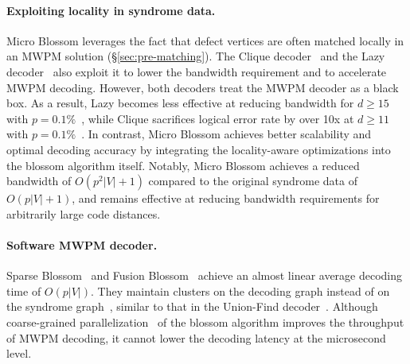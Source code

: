 \paragraph{Exploiting locality in syndrome data.} Micro Blossom leverages the fact that defect vertices are often matched locally in an MWPM solution (\S\ref{sec:pre-matching}).
The Clique decoder~\cite{ravi2023better} and the Lazy decoder~\cite{delfosse2020hierarchical} also exploit it to lower the bandwidth requirement and to accelerate MWPM decoding.
However, both decoders treat the MWPM decoder as a black box. As a result, Lazy becomes less effective at reducing bandwidth for $d \ge 15$ with $p=0.1\%$~\cite{delfosse2020hierarchical}, 
while Clique sacrifices logical error rate by over 10x at $d \ge 11$ with $p=0.1\%$~\cite{ravi2023better}.
In contrast, Micro Blossom achieves better scalability and optimal decoding accuracy by integrating the locality-aware optimizations into the blossom algorithm itself.
Notably, Micro Blossom achieves a reduced bandwidth of $O(p^2 |V| + 1)$ compared to the original syndrome data of $O(p|V| + 1)$, and remains effective at reducing bandwidth requirements for arbitrarily large code distances.

\paragraph{Software MWPM decoder.}
Sparse Blossom~\cite{higgott2025sparse} and Fusion Blossom~\cite{wu2023qce} achieve an almost linear average decoding time of $O(p |V|)$.
They maintain clusters on the decoding graph instead of on the syndrome graph~\cite{wu2022interpretation}, similar to that in the Union-Find decoder~\cite{delfosse2021almost}.
Although coarse-grained parallelization~\cite{wu2023qce} of the blossom algorithm improves the throughput of MWPM decoding, it cannot lower the decoding latency at the microsecond level.